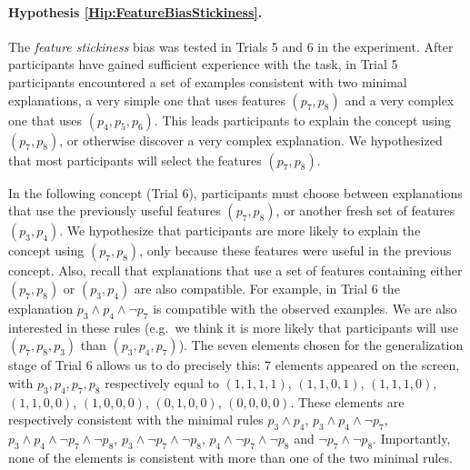 
\paragraph{Hypothesis \ref{Hip:FeatureBiasStickiness}.} 
    The \textit{feature stickiness} bias was tested in Trials 5 and 6 in the experiment. After participants have gained sufficient experience with the task, in Trial 5 participants encountered a set of examples consistent with two minimal explanations, a very simple one that uses features $(p_7, p_8)$ and a very complex one that uses $(p_4,p_5,p_6)$. This leads participants to explain the concept using $(p_7, p_8)$, or otherwise discover a very complex explanation. We hypothesized that most participants will select the features $(p_7, p_8)$.
    
        In the following concept (Trial 6), participants must choose between explanations that use the previously useful features $(p_7, p_8)$, or another fresh set of features $(p_3, p_4)$. We hypothesize that participants are more likely to explain the concept using $(p_7, p_8)$, only because these features were useful in the previous concept. Also, recall that explanations that use a set of features containing either $(p_7, p_8)$ or $(p_3, p_4)$ are also compatible. For example, in Trial 6 the explanation $p_3 \land p_4 \land \lnot p_7$ is compatible with the observed examples. We are also interested in these rules (e.g.\ we think it is more likely that participants will use $(p_7, p_8, p_3)$ than $(p_3, p_4, p_7)$). The seven elements chosen for the generalization stage of Trial 6 allows us to do precisely this: 7 elements appeared on the screen, with $p_3, p_4, p_7, p_8$ respectively equal to $(1, 1, 1, 1)$, $(1, 1, 0, 1)$, $(1, 1, 1, 0)$, $(1, 1, 0, 0)$, $(1, 0, 0, 0)$, $(0, 1, 0, 0)$, $(0, 0, 0, 0)$. These elements are respectively consistent with the minimal rules $p_3 \land p_4$, $p_3 \land p_4 \land \lnot p_7$, $p_3 \land p_4 \land \lnot p_7 \land \lnot p_8$, $p_3 \land \lnot p_7 \land \lnot p_8$, $p_4 \land \lnot p_7 \land \lnot p_8$ and  $\lnot p_7 \land \lnot p_8$. Importantly, none of the elements is consistent with more than one of the two minimal rules.
    
